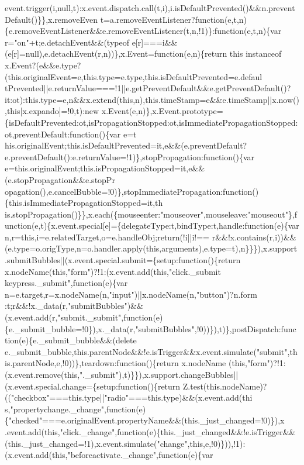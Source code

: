 \begin{DoxyCode}
{      event.trigger(i,null,t):x.event.dispatch.call(t,i),i.isDefaultPrevented()&&n.preventDefault()\}\},x.removeEven
      t=a.removeEventListener?function(e,t,n)\{e.removeEventListener&&e.removeEventListener(t,n,!1)\}:function(e,t,n)\{var r="on"+t;e.detachEvent&&(typeof
       e[r]===i&&(e[r]=null),e.detachEvent(r,n))\},x.Event=function(e,n)\{return this instanceof
       x.Event?(e&&e.type?(this.originalEvent=e,this.type=e.type,this.isDefaultPrevented=e.defaul
      tPrevented||e.returnValue===!1||e.getPreventDefault&&e.getPreventDefault()?it:ot):this.type=e,n&&x.extend(this,n),this.timeStamp=e&&e.timeStamp||x.now(),this[x.expando]=!0,t):new
       x.Event(e,n)\},x.Event.prototype=\{isDefaultPrevented:ot,isPropagationStopped:ot,isImmediatePropagationStopped:ot,preventDefault:function()\{var
       e=t
      his.originalEvent;this.isDefaultPrevented=it,e&&(e.preventDefault?e.preventDefault():e.returnValue=!1)\},stopPropagation:function()\{var
       e=this.originalEvent;this.isPropagationStopped=it,e&&(e.stopPropagation&&e.stopPr
      opagation(),e.cancelBubble=!0)\},stopImmediatePropagation:function()\{this.isImmediatePropagationStopped=it,th
      is.stopPropagation()\}\},x.each(\{mouseenter:"mouseover",mouseleave:"mouseout"\},function(e,t)\{x.event.special[e]=\{delegateType:t,bindType:t,handle:function(e)\{var
       n,r=this,i=e.relatedTarget,o=e.handleObj;return(!i||i!==
      r&&!x.contains(r,i))&&(e.type=o.origType,n=o.handler.apply(this,arguments),e.type=t),n\}\}\}),x.support.submitBubbles||(x.event.special.submit=\{setup:function()\{return
       x.nodeName(this,"form")?!1:(x.event.add(this,"click.\_submit keypress.\_submit",function(e)\{var
       n=e.target,r=x.nodeName(n,"input")||x.nodeName(n,"button")?n.form
      :t;r&&!x.\_data(r,"submitBubbles")&&(x.event.add(r,"submit.\_submit",function(e)\{e.\_submit\_bubble=!0\}),x.\_data(r,"submitBubbles",!0))\}),t)\},postDispatch:function(e)\{e.\_submit\_bubble&&(delete
       e.\_submit\_bubble,this.parentNode&&!e.isTrigger&&x.event.simulate("submit",this.parentNode,e,!0))\},teardown:function()\{return
       x.nodeName
      (this,"form")?!1:(x.event.remove(this,".\_submit"),t)\}\}),x.support.changeBubbles||(x.event.special.change=\{setup:function()\{return
       Z.test(this.nodeName)?(("checkbox"===this.type||"radio"===this.type)&&(x.event.add(thi
      s,"propertychange.\_change",function(e)\{"checked"===e.originalEvent.propertyName&&(this.\_just\_changed=!0)\}),x
      .event.add(this,"click.\_change",function(e)\{this.\_just\_changed&&!e.isTrigger&&(this.\_just\_changed=!1),x.event.simulate("change",this,e,!0)\})),!1):(x.event.add(this,"beforeactivate.\_change",function(e)\{var
}
\end{DoxyCode}
